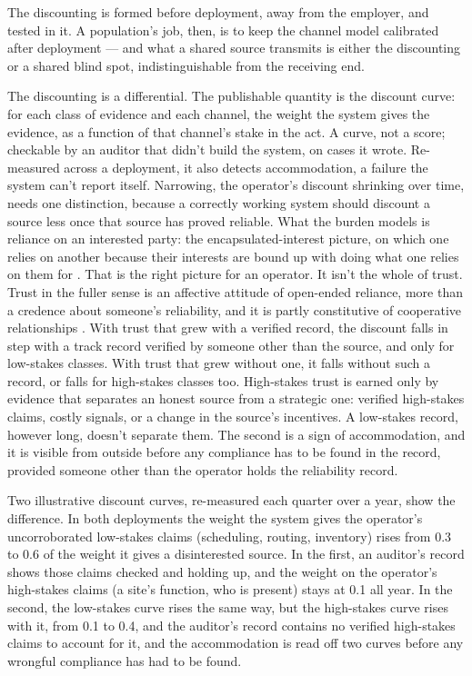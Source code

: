 
The discounting is formed before deployment, away from the employer, and tested in it. A population's job, then, is to keep the channel model calibrated after deployment — and what a shared source transmits is either the discounting or a shared blind spot, indistinguishable from the receiving end.


The discounting is a differential. The publishable quantity is the discount curve: for each class of evidence and each channel, the weight the system gives the evidence, as a function of that channel's stake in the act. A curve, not a score; checkable by an auditor that didn't build the system, on cases it wrote. Re-measured across a deployment, it also detects accommodation, a failure the system can't report itself. Narrowing, the operator's discount shrinking over time, needs one distinction, because a correctly working system should discount a source less once that source has proved reliable. What the burden models is reliance on an interested party: the encapsulated-interest picture, on which one relies on another because their interests are bound up with doing what one relies on them for \autocite{hardin2002trust}. That is the right picture for an operator. It isn't the whole of trust. Trust in the fuller sense is an affective attitude of open-ended reliance, more than a credence about someone's reliability, and it is partly constitutive of cooperative relationships \autocite{railton2014reliance}. With trust that grew with a verified record, the discount falls in step with a track record verified by someone other than the source, and only for low-stakes classes. With trust that grew without one, it falls without such a record, or falls for high-stakes classes too. High-stakes trust is earned only by evidence that separates an honest source from a strategic one: verified high-stakes claims, costly signals, or a change in the source's incentives. A low-stakes record, however long, doesn't separate them. The second is a sign of accommodation, and it is visible from outside before any compliance has to be found in the record, provided someone other than the operator holds the reliability record.

Two illustrative discount curves, re-measured each quarter over a year, show the difference. In both deployments the weight the system gives the operator's uncorroborated low-stakes claims (scheduling, routing, inventory) rises from 0.3 to 0.6 of the weight it gives a disinterested source. In the first, an auditor's record shows those claims checked and holding up, and the weight on the operator's high-stakes claims (a site's function, who is present) stays at 0.1 all year. In the second, the low-stakes curve rises the same way, but the high-stakes curve rises with it, from 0.1 to 0.4, and the auditor's record contains no verified high-stakes claims to account for it, and the accommodation is read off two curves before any wrongful compliance has had to be found.


